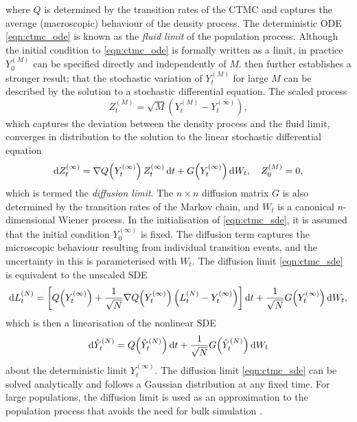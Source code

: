 where \(Q\) is determined by the transition rates of the CTMC and captures the average (macroscopic) behaviour of the density process.
The deterministic ODE \cref{eqn:ctmc_ode} is known as the \emph{fluid limit} of the population process.
Although the initial condition to \cref{eqn:ctmc_ode} is formally written as a limit, in practice \(Y_0^{(M)}\) can be specified directly and independently of \(M\).
\citet{Kurtz_1971_LimitTheoremsSequences} then further establishes a stronger result; that the stochastic variation of \(Y_t^{(M)}\) for large \(M\) can be described by the solution to a stochastic differential equation.
The scaled process
\[
	Z_t^{(M)} = \sqrt{M}\left(Y_t^{(M)} - Y_t^{(\infty)}\right),
\]
which captures the deviation between the density process and the fluid limit, converges in distribution to the solution to the linear stochastic differential equation \citep{Kurtz_1971_LimitTheoremsSequences}
\begin{equation}
	\dif Z_t^{(\infty)} = \nabla Q\!\left(Y_t^{(\infty)}\right) Z_t^{(\infty)}\dif t + G\!\left(Y_t^{(\infty)}\right)\dif W_t, \quad Z_0^{(M)} = 0,
	\label{eqn:ctmc_sde}
\end{equation}
which is termed the \emph{diffusion limit}.
The \(n\times n\) diffusion matrix \(G\) is also determined by the transition rates of the Markov chain, and \(W_t\) is a canonical \(n\)-dimensional Wiener process.
In the initialisation of \cref{eqn:ctmc_sde}, it is assumed that the initial condition \(Y_0^{(\infty)}\) is fixed.
The diffusion term captures the microscopic behaviour resulting from individual transition events, and the uncertainty in this is parameterised with \(W_t\).
The diffusion limit \cref{eqn:ctmc_sde} is equivalent to the unscaled SDE
\begin{equation}
	\dif L_t^{(N)} = \left[Q\!\left(Y_t^{(\infty)}\right) + \frac{1}{\sqrt{N}} \nabla Q\!\left(Y_t^{(\infty)}\right)\left(L_t^{(N)} - Y_t^{(\infty)}\right)\right]\dif t + \frac{1}{\sqrt{N}}G\!\left(Y_t^{(\infty)}\right)\dif W_t,
	\label{eqn:ctmc_sde_lin_lim}
\end{equation}
which is then a linearisation of the nonlinear SDE
\begin{equation}
	\dif \hat{Y}^{(N)}_t = Q\!\left(\hat{Y}^{(N)}_t\right)\dif t + \frac{1}{\sqrt{N}}G\!\left(\hat{Y}_t^{(N)}\right)\dif W_t
	\label{eqn:ctmc_sde_lim_nonlin}
\end{equation}
about the deterministic limit \(Y_t^{(\infty)}\).
The diffusion limit \cref{eqn:ctmc_sde} can be solved analytically and follows a Gaussian distribution at any fixed time.
For large populations, the diffusion limit is used as an approximation to the population process that avoids the need for bulk simulation \citep{PollettEtAl_2010_ModellingPopulationProcesses}.

